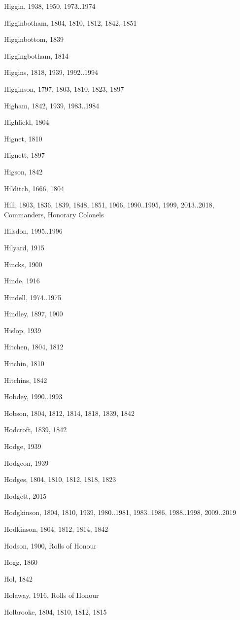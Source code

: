 \begin{theindex}
\item Higgin, 1938, 1950, 1973..1974
\item Higginbotham, 1804, 1810, 1812, 1842, 1851
\item Higginbottom, 1839
\item Higgingbotham, 1814
\item Higgins, 1818, 1939, 1992..1994
\item Higginson, 1797, 1803, 1810, 1823, 1897
\item Higham, 1842, 1939, 1983..1984
\item Highfield, 1804
\item Hignet, 1810
\item Hignett, 1897
\item Higson, 1842
\item Hilditch, 1666, 1804
\item Hill, 1803, 1836, 1839, 1848, 1851, 1966, 1990..1995, 1999, 2013..2018, Commanders, Honorary Colonels
\item Hilsdon, 1995..1996
\item Hilyard, 1915
\item Hincks, 1900
\item Hinde, 1916
\item Hindell, 1974..1975
\item Hindley, 1897, 1900
\item Hislop, 1939
\item Hitchen, 1804, 1812
\item Hitchin, 1810
\item Hitchins, 1842
\item Hobdey, 1990..1993
\item Hobson, 1804, 1812, 1814, 1818, 1839, 1842
\item Hodcroft, 1839, 1842
\item Hodge, 1939
\item Hodgeon, 1939
\item Hodges, 1804, 1810, 1812, 1818, 1823
\item Hodgett, 2015
\item Hodgkinson, 1804, 1810, 1939, 1980..1981, 1983..1986, 1988..1998, 2009..2019
\item Hodkinson, 1804, 1812, 1814, 1842
\item Hodson, 1900, Rolls of Honour
\item Hogg, 1860
\item Hol, 1842
\item Holaway, 1916, Rolls of Honour
\item Holbrooke, 1804, 1810, 1812, 1815

\end{theindex}
